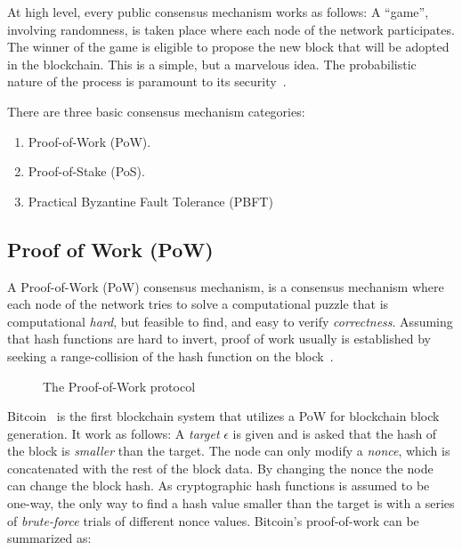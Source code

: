 At high level, every public consensus mechanism works as follows: A ``game'', involving randomness, is taken place where each node of the network participates. The winner of the game is eligible to propose the new block that will be adopted in the blockchain. This is a simple, but a marvelous idea. The probabilistic nature of the process is paramount to its security~\cite{10.1007/978-3-662-46803-6_10}.

There are three basic consensus mechanism categories:

\begin{enumerate}
  \item Proof-of-Work (PoW).
  \item Proof-of-Stake (PoS).
  \item Practical Byzantine Fault Tolerance (PBFT)
\end{enumerate}


\subsection{Proof of Work (PoW)}\label{blockchain:consensus:pow}

A Proof-of-Work (PoW) consensus mechanism, is a consensus mechanism where each node of the network tries to solve a computational puzzle that is computational \textit{hard}, but feasible to find, and easy to verify \textit{correctness}. Assuming that hash functions are hard to invert, proof of work usually is established by seeking a range-collision of the hash function on the block~\cite{zindros_thesis}.

\begin{figure}[!ht]
  \centering
  \caption{The Proof-of-Work protocol}
  \label{fig:consensus:pow}
\end{figure}

Bitcoin~\cite{Zohar:2015:BUH:2817191.2701411} is the first blockchain system that utilizes a PoW for blockchain block generation. It work as follows: A \textit{target} $\epsilon$ is given and is asked that the hash of the block is \textit{smaller} than the target. The node can only modify a \textit{nonce}, which is concatenated with the rest of the block data. By changing the nonce the node can change the block hash. As cryptographic hash functions is assumed to be one-way, the only way to find a hash value smaller than the target is with a series of \textit{brute-force} trials of different nonce values. Bitcoin's proof-of-work can be summarized as:

